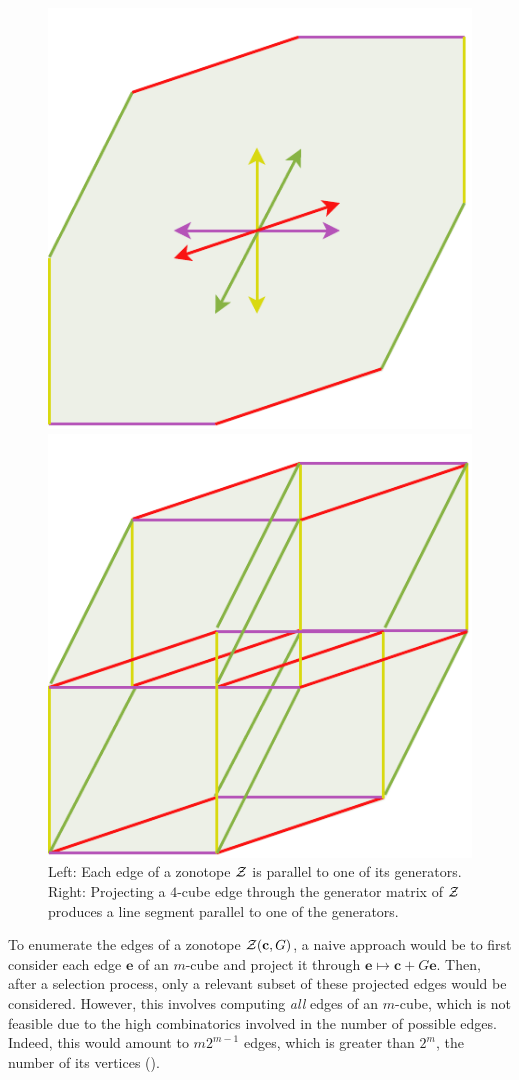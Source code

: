 \begin{figure}[!htb]
      \captionsetup{justification=centering}
      \begin{minipage}{0.49\linewidth}
        \centering
        \includegraphics[trim={0 0 0 0},clip, width=0.55\linewidth]{img/chapter_2/zonotope_edges_parallel_generator.pdf}
      \end{minipage}
      \hfill
      \begin{minipage}{0.49\linewidth}
        \centering
        \includegraphics[trim={0 0 0 0},clip,width=0.55\linewidth]{img/chapter_2/zonotope_edges_parallel_generator_alt.pdf}
      \end{minipage}
      \caption{Left: Each edge of a zonotope $\mathcal{Z}$ is parallel to one of its generators. Right: Projecting a $4$-cube edge through the generator matrix of $\mathcal{Z}$ produces a line segment parallel to one of the generators.}
      \label{fig:zonotope_edges_parallel}
    \end{figure}
    
To enumerate the edges of a zonotope $\mathcal{Z}(\mathbf{c}, G)$, a naive approach would be to first consider each edge $\mathbf{e}$ of an $m$-cube and project it through $\mathbf{e} \mapsto \mathbf{c} + G\mathbf{e}$. Then, after a selection process, only a relevant subset of these projected edges would be considered. However, this involves computing \emph{all} edges of an $m$-cube, which is not feasible due to the high combinatorics involved in the number of possible edges. Indeed, this would amount to $m2^{m-1}$ edges, which is greater than $2^m$, the number of its vertices (\cite{grunbaumConvexPolytopes2013}).

